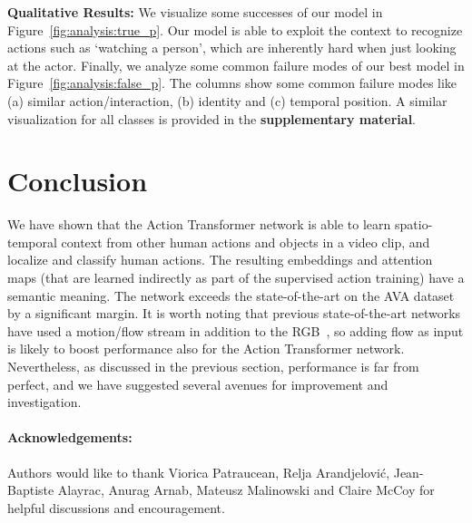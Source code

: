 \documentclass[10pt,twocolumn,letterpaper]{article}
\newcommand{\Tx}[0]{Action Transformer}
\begin{document}
{\bf \noindent Qualitative Results:}
We visualize some successes of our model in Figure~\ref{fig:analysis:true_p}.
Our model is able to exploit the context to recognize actions such as `watching a person', which are inherently hard when just looking at the actor.
Finally, we analyze some common failure modes of our best model in Figure~\ref{fig:analysis:false_p}. The columns show some common failure modes like (a) similar action/interaction, (b) identity and (c) temporal position.
A similar visualization for all classes is provided in the {\bf supplementary material}.



 \section{Conclusion}

We have shown that the \Tx{} network is able to learn spatio-temporal context from other human actions
and objects in a video clip, and localize and classify human actions. The resulting embeddings and attention
maps (that are learned indirectly as part of the supervised action training) have 
a semantic meaning. 
The network exceeds the state-of-the-art on the AVA dataset by a significant margin.
It is worth noting that previous state-of-the-art networks
have used a motion/flow stream in addition to the RGB~\cite{carreira2017quo,xie2017rethinking}, so adding
flow as input is likely to  boost performance also for the \Tx{} network.
Nevertheless, as discussed in the previous section, performance is far from perfect, and we have suggested
several avenues for improvement and investigation. %
 \paragraph{Acknowledgements:}
Authors would like to thank Viorica Patraucean, Relja Arandjelovi\'{c}, Jean-Baptiste Alayrac, Anurag Arnab, Mateusz Malinowski and Claire McCoy for helpful discussions and encouragement. 
{\small


}
\end{document}
